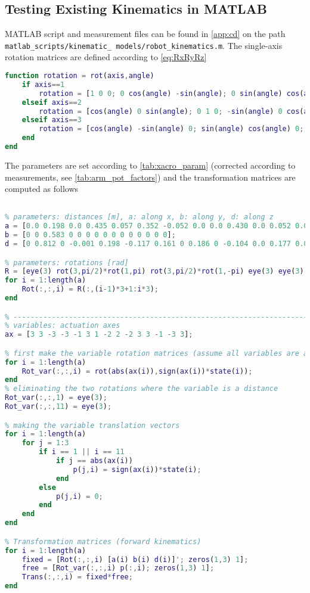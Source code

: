 \newpage

\subsection{Testing Existing Kinematics in MATLAB}
MATLAB script and measurement files can be found in \autoref{app:cd} on the path \texttt{matlab\_scripts/kinematic\_ models/robot\_kinematics.m}.
The single-axis rotation matrices are defined according to \autoref{eq:RxRyRz}

\begin{lstlisting}[language=matlab]
function rotation = rot(axis,angle)
	if axis==1
		rotation = [1 0 0; 0 cos(angle) -sin(angle); 0 sin(angle) cos(angle)];
	elseif axis==2
		rotation = [cos(angle) 0 sin(angle); 0 1 0; -sin(angle) 0 cos(angle)];
	elseif axis==3
		rotation = [cos(angle) -sin(angle) 0; sin(angle) cos(angle) 0; 0 0 1];
	end
end
\end{lstlisting}

The parameters are set according to \autoref{tab:xacro_param} (corrected according to measurements, see \autoref{tab:arm_pot_factors}) and the transformation matrices are computed as follows

\begin{lstlisting}[language=matlab]
%% Existing reference frames according to xacro files

% parameters: distances [m], a: along x, b: along y, d: along z
a = [0.0 0.198 0.0 0.435 0.057 0.352 -0.052 0.0 0.0 0.430 0.0 0.052 0.0 0.0 0.0];
b = [0 0 0.583 0 0 0 0 0 0 0 0 0 0 0 0];
d = [0 0.812 0 -0.001 0.198 -0.117 0.161 0 0.186 0 -0.104 0.0 0.177 0.009 0.009];

% parameters: rotations [rad]
R = [eye(3) rot(3,pi/2)*rot(1,pi) rot(3,pi/2)*rot(1,-pi) eye(3) eye(3) eye(3) eye(3) rot(2,-0.1745) rot(2,0.1745)*rot(1,pi) rot(1,pi) eye(3) rot(3,pi/2)*rot(1,pi) eye(3) rot(2,pi/2)*rot(1,pi/2) rot(2,pi/2)*rot(1,pi/2)];
for i = 1:length(a)
	Rot(:,:,i) = R(:,(i-1)*3+1:i*3);
end

% -----------------------------------------------------------------------
% variables: actuation axes
ax = [3 3 -3 -3 -1 3 1 -2 2 -2 3 3 -1 -3 3];

% first make the variable rotation matrices (assume all variables are angles)
for i = 1:length(a)
	Rot_var(:,:,i) = rot(abs(ax(i)),sign(ax(i))*state(i));
end
% eliminating the two rotations where the variable is a distance
Rot_var(:,:,1) = eye(3);
Rot_var(:,:,11) = eye(3);

% making the variable translation vectors
for i = 1:length(a)
	for j = 1:3
		if i == 1 || i == 11
			if j == abs(ax(i)) 
				p(j,i) = sign(ax(i))*state(i);
			end
		else
			p(j,i) = 0;
		end
	end
end

% Transformation matrices (forward kinematics)
for i = 1:length(a)
	fixed = [Rot(:,:,i) [a(i) b(i) d(i)]'; zeros(1,3) 1];
	free = [Rot_var(:,:,i) p(:,i); zeros(1,3) 1];
	Trans(:,:,i) = fixed*free;
end
\end{lstlisting}


